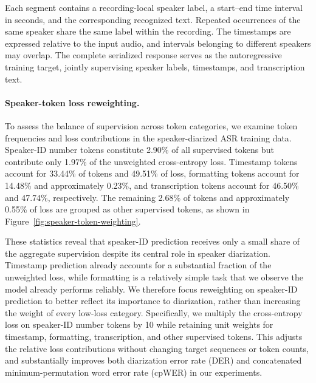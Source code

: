 \documentclass{article}
\begin{document}
Each segment contains a recording-local speaker label, a start--end time interval in seconds, and the corresponding recognized text. Repeated occurrences of the same speaker share the same label within the recording. The timestamps are expressed relative to the input audio, and intervals belonging to different speakers may overlap. The complete serialized response serves as the autoregressive training target, jointly supervising speaker labels, timestamps, and transcription text.

\paragraph{Speaker-token loss reweighting.}
To assess the balance of supervision across token categories, we examine token frequencies and loss contributions in the speaker-diarized ASR training data. Speaker-ID number tokens constitute 2.90\% of all supervised tokens but contribute only 1.97\% of the unweighted cross-entropy loss. Timestamp tokens account for 33.44\% of tokens and 49.51\% of loss, formatting tokens account for 14.48\% and approximately 0.23\%, and transcription tokens account for 46.50\% and 47.74\%, respectively. The remaining 2.68\% of tokens and approximately 0.55\% of loss are grouped as other supervised tokens, as shown in Figure~\ref{fig:speaker-token-weighting}.

These statistics reveal that speaker-ID prediction receives only a small share of the aggregate supervision despite its central role in speaker diarization. Timestamp prediction already accounts for a substantial fraction of the unweighted loss, while formatting is a relatively simple task that we observe the model already performs reliably. We therefore focus reweighting on speaker-ID prediction to better reflect its importance to diarization, rather than increasing the weight of every low-loss category. Specifically, we multiply the cross-entropy loss on speaker-ID number tokens by 10 while retaining unit weights for timestamp, formatting, transcription, and other supervised tokens. This adjusts the relative loss contributions without changing target sequences or token counts, and substantially improves both diarization error rate (DER) and concatenated minimum-permutation word error rate (cpWER) in our experiments.
\end{document}
